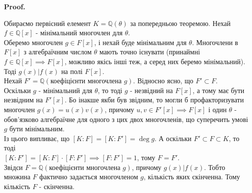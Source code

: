 \documentclass[a4paper, 14pt]{extarticle}
\makeatletter
\theoremstyle{theoremdd}
\theoremstyle{theoremdd}
\theoremstyle{theoremdd}
\theoremstyle{theoremdd}
\theoremstyle{theoremdd}
\theoremstyle{theoremdd}
\theoremstyle{theoremdd}
\theoremstyle{theoremdd}
\def\qed{$\blacksquare$}
\renewenvironment{proof}[1][Proof.\\]{\par
\pushQED{\hfill \qed}%
\normalfont \topsep6\p@\@plus6\p@\relax
\trivlist
\item\relax
{\bfseries
#1\@addpunct{.}}\hspace\labelsep\ignorespaces
}{%
\popQED\endtrivlist\@endpefalse
}
\makeatother
\begin{document}
\begin{proof}
Обираємо первісний елемент $K = \mathbb{Q}(\theta)$ за попередньою теоремою. Нехай $f \in \mathbb{Q}[x]$ - мінімальний многочлен для $\theta$.\\
Оберемо многочлен $g \in F[x]$, і нехай буде мінімальним для $\theta$. Многочлени в $F[x]$ з алгебраїчним числом $\theta$ мають точно існувати (принаймні $f \in \mathbb{Q}[x] \implies F[x]$, можливо якісь інші теж, а серед них беремо мінімальний).\\
Тоді $g(x) | f(x)$ на полі $F[x]$.\\
Нехай $F' = \mathbb{Q}(\text{коефіцієнти многочлена }g)$. Відносно ясно, що $F' \subset F$.\\
Оскільки $g$ - мінімальний для $\theta$, то тоді $g$ - незвідний на $F[x]$, а тому має бути незвідним на $F'[x]$. Бо інакше якби був звідним, то могли б профакторизувати многочлен $g(x) = u(x)v(x)$, причому $u,v \in F'[x] \implies F[x]$ і один $\theta$ - обов'язково алгебраїчне для одного з цих двох многочленів, що суперечить умові $g$ бути мінімальним.\\
\iffalse
Із конструкції $F'$ маємо, що $g(x) \in F'[x]$, а також є мінімальним многочленом для $\theta$ в $F'[x]$. Бо якби $g$ таким не був, то оскільки $F' \subset F$, то тоді коефи $g$ в $F$ - а тому не був би мінімальним в $F$, що суперечить.\\
\fi
\iffalse
$K = \mathbb{Q}(\theta) = F'(\theta) = F(\theta)$.\\
Із іншого боку, $F' \subset F \subset K$, та оскільки $g$ - мінімальний над полем $F$ та $F'$, то звідси $[K:F'] = [K:F] = \deg g$. Отже,\\
\fi
Із цього випливає, що $[K:F] = [K:F'] = \deg g$. А оскільки $F' \subset F \subset K$, то тоді\\
$[K:F'] = [K:F] \cdot [F:F'] \implies [F:F'] = 1$, тому $F = F'$.\\
Звідси $F = \mathbb{Q}(\text{коефіцієнти многочлена }g)$, причому $g(x) | f(x)$. Тобто множина $F$ фактично задається многочленом $g$, кількість яких скінченна. Тому кількість $F$ - скінченна.
\end{proof}
\end{document}
